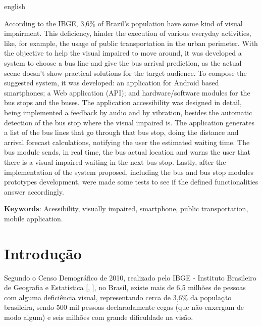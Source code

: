 \documentclass[
	12pt,				%
	oneside,			%
	a4paper,			%
	brazil				%
]{abntex2}
\newcommand{\citecustom}[1]{[\citeauthoronline{#1}, \citeyear{#1}]}
\newcommand*{\BeginNoToc}{%
  \addtocontents{toc}{%
    \edef\protect\SavedTocDepth{\protect\the\protect\value{tocdepth}}%
  }%
  \addtocontents{toc}{%
    \protect\setcounter{tocdepth}{-10}%
  }%
}
\newcommand*{\EndNoToc}{%
  \addtocontents{toc}{%
    \protect\setcounter{tocdepth}{\protect\SavedTocDepth}%
  }%
}
\begin{document}
\begin{resumo}[Abstract] 
\begin{otherlanguage*}{english}

According to the IBGE, 3,6\% of Brazil's population have some kind of visual impairment. This deficiency, hinder the execution of various everyday activities, like, for example, the usage of public transportation in the urban perimeter. With the objective to help the visual impaired to move around, it was developed a system to choose a bus line and give the bus arrival prediction, as the actual scene doesn't show practical solutions for the target audience. To compose the suggested system, it was developed: an application for Android based smartphones; a Web application (API); and hardware/software modules for the bus stops and the buses. The application accessibility was designed in detail, being implemented
a feedback by audio and by vibration, besides the automatic detection of the bus stop where the visual impaired is. The application generates a list of the bus lines that go through that bus stop, doing the distance and arrival forecast calculations, notifying the user the estimated waiting time. The bus module sends, in real time, the bus actual location and warns the user that there is a visual impaired waiting in the next bus stop. Lastly, after the implementation of the system proposed, including the bus and bus stop modules prototypes development, were made some tests to see if the defined functionalities answer accordingly.

\vspace{\onelineskip} 
\noindent \textbf{Keywords}: Acessibility, visually impaired, smartphone, public transportation, mobile application. 
\end{otherlanguage*} 
\end{resumo} 


\listoffigures*\thispagestyle{empty} \newpage

\BeginNoToc
\tableofcontents*
\EndNoToc

\newpage

\textual

\chapter{Introdução}

Segundo o Censo Demográfico de 2010, realizado pelo IBGE - Instituto Brasileiro de Geografia e Estatística \citecustom{ibge}, no Brasil, existe mais de 6,5 milhões de pessoas com alguma deficiência visual, representando cerca de 3,6\% da população brasileira, sendo 500 mil pessoas declaradamente cegas (que não enxergam de modo algum) e seis milhões com grande dificuldade na visão.
\end{document}
